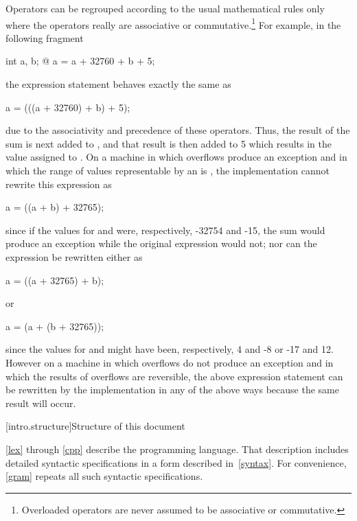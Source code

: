\pnum
{}%
%
\begin{note} Operators can be regrouped according to the usual
mathematical rules only where the operators really are associative or
commutative.\footnote{Overloaded operators are never assumed to be associative or
commutative. }
For example, in the following fragment
\begin{codeblock}
int a, b;
@\commentellip@
a = a + 32760 + b + 5;
\end{codeblock}
the expression statement behaves exactly the same as
\begin{codeblock}
a = (((a + 32760) + b) + 5);
\end{codeblock}
due to the associativity and precedence of these operators. Thus, the
result of the sum  is next added to , and
that result is then added to 5 which results in the value assigned to
. On a machine in which overflows produce an exception and in
which the range of values representable by an  is
, the implementation cannot rewrite this
expression as
\begin{codeblock}
a = ((a + b) + 32765);
\end{codeblock}
since if the values for  and  were, respectively,
-32754 and -15, the sum  would produce an exception while
the original expression would not; nor can the expression be rewritten
either as
\begin{codeblock}
a = ((a + 32765) + b);
\end{codeblock}
or
\begin{codeblock}
a = (a + (b + 32765));
\end{codeblock}
since the values for  and  might have been,
respectively, 4 and -8 or -17 and 12. However on a machine in which
overflows do not produce an exception and in which the results of
overflows are reversible, the above expression statement can be
rewritten by the implementation in any of the above ways because the
same result will occur. \end{note}

[intro.structure]{Structure of this document}

\pnum
{}%
%
\ref{lex} through \ref{cpp} describe the \Cpp{} programming
language. That description includes detailed syntactic specifications in
a form described in~\ref{syntax}. For convenience, \ref{gram}
repeats all such syntactic specifications.

